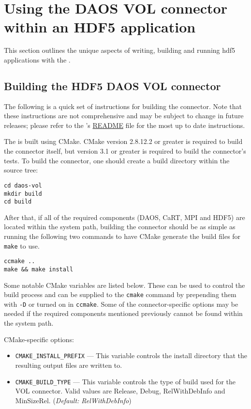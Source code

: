 \documentclass[../users_guide.tex]{subfiles}
\begin{document}
\section{Using the DAOS VOL connector within an HDF5 application}

This section outlines the unique aspects of writing, building and running
\acrshort{hdf5} applications with the \dvc{}.

\subsection{Building the HDF5 DAOS VOL connector}

The following is a quick set of instructions for building the \dvc{} connector.
Note that these instructions are not comprehensive and may be subject to change
in future releases; please refer to the \dvc{}'s
\href{https://bitbucket.hdfgroup.org/projects/HDF5VOL/repos/daos-vol/browse/README.md}{README} file for the most up to date instructions.

The \dvc{} is built using CMake. CMake version 2.8.12.2 or greater is required
to build the connector itself, but version 3.1 or greater is required to build
the connector's tests. To build the connector, one should create a build
directory within the source tree:

\begin{verbatim}
cd daos-vol
mkdir build
cd build
\end{verbatim}

After that, if all of the required components (DAOS, CaRT, MPI and HDF5) are
located within the system path, building the connector should be as simple as
running the following two commands to have CMake generate the build files for
\texttt{make} to use.

\begin{verbatim}
ccmake ..
make && make install
\end{verbatim}

Some notable CMake variables are listed below. These can be used to control
the build process and can be supplied to the \texttt{cmake} command by
prepending them with \texttt{-D} or turned on in \texttt{ccmake}. Some of the
connector-specific options may be needed if the required components mentioned
previously cannot be found within the system path.

CMake-specific options:

\begin{itemize}
  \item \texttt{CMAKE\_INSTALL\_PREFIX} --- This variable controls the install directory that the resulting output files are written to.
  \item \texttt{CMAKE\_BUILD\_TYPE} --- This variable controls the type of build used for the VOL connector. Valid values are Release, Debug, RelWithDebInfo and MinSizeRel. (\textit{Default: RelWithDebInfo})
\end{itemize}
\end{document}
